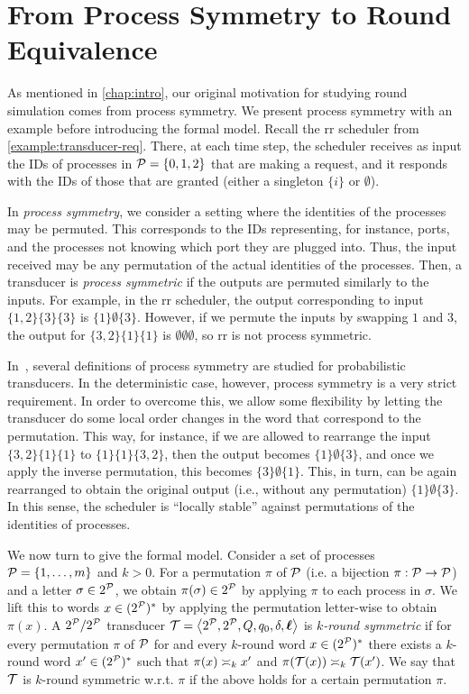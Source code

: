 \chapter{From Process Symmetry to Round Equivalence}
\label{chap:application}

As mentioned in \autoref{chap:intro}, our original motivation for studying round simulation comes from process symmetry. We present process symmetry with an example before introducing the formal model.
Recall the \gls{rr} scheduler from \autoref{example:transducer-req}. There, at each time step, the scheduler receives as input the IDs of processes in $\cP=\{0,1,2\}$ that are making a request, and it responds with the IDs of those that are granted (either a singleton $\{i\}$ or $\emptyset$).

In \emph{process symmetry}, we consider a setting where the identities of the processes may be permuted. This corresponds to the IDs representing, for instance, ports, and the processes not knowing which port they are plugged into. Thus, the input received may be any permutation of the actual identities of the processes. Then, a transducer is \emph{process symmetric} if the outputs are permuted similarly to the inputs. For example, in the \gls{rr} scheduler, the output corresponding to input $\{1,2\}\{3\}\{3\}$ is $\{1\}\emptyset\{3\}$. However, if we permute the inputs by swapping $1$ and $3$, the output for $\{3,2\}\{1\}\{1\}$ is $\emptyset\emptyset\emptyset$, so \gls{rr} is not process symmetric.

In~\cite{Almagor2020b}, several definitions of process symmetry are studied for probabilistic transducers. In the deterministic case, however, process symmetry is a very strict requirement. In order to overcome this, we allow some flexibility by letting the transducer do some local order changes in the word that correspond to the permutation. This way, for instance, if we are allowed to rearrange the input $\{3,2\}\{1\}\{1\}$ to $\{1\}\{1\}\{3,2\}$, then the output becomes $\{1\}\emptyset\{3\}$, and once we apply the inverse permutation, this becomes $\{3\}\emptyset\{1\}$. This, in turn, can be again rearranged to obtain the original output (i.e., without any permutation) $\{1\}\emptyset\{3\}$.
In this sense, the scheduler is ``locally stable'' against permutations of the identities of processes.

We now turn to give the formal model.
Consider a set of processes $\cP=\{1,\dots,m\}$ and $k>0$. For a permutation $\pi$ of $\cP$ (i.e. a bijection $\pi:\cP\to \cP$) and a letter $\sigma\in 2^{\cP}$, we obtain $\pi(\sigma)\in 2^{\cP}$ by applying $\pi$ to each process in $\sigma$. We lift this to words $x\in (2^{\cP})^*$ by applying the permutation letter-wise to obtain $\pi(x)$.
A $2^\cP/2^\cP$ transducer $\cT=\tup{2^\cP,2^\cP,Q,q_0,\delta,\lab}$ is \emph{$k$-round symmetric} if for every permutation $\pi$ of $\cP$ for and every $k$-round word $x\in (2^{\cP})^*$ there exists a $k$-round word $x' \in (2^{\cP})^*$ such that $\pi(x)\req[k] x'$ and $\pi(\cT(x))\req[k] \cT(x')$.
We say that $\cT$ is $k$-round symmetric w.r.t.\! $\pi$ if the above holds for a certain permutation $\pi$.

